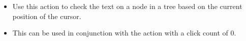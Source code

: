 
\begin{itemize}
\item Use this action to check the text on a node in a tree based on the current position of the cursor.
\item This can be used in conjunction with the action   with a click count of 0.  
\end{itemize}
